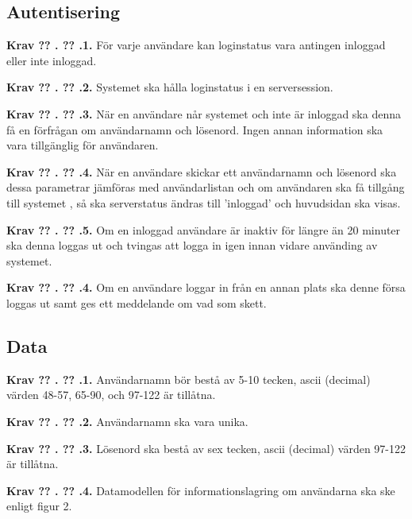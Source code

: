 \documentclass[a4paper]{article}
\newcommand\getcurrentref[1]{%
 \ifnumequal{\value{#1}}{0}
  {??}
  {\the\value{#1}}%
}
\newcommand\requirement[2]{
	\numberedrow{Krav}{#1}{#2}
}
\newcommand\numberedrow[3]{
	\noindent
	\textbf{#1 \getcurrentref{section}.\getcurrentref{subsection}.#2.} #3
	
}
\begin{document}
\subsection{Autentisering}
\requirement{1}{För varje användare kan loginstatus vara antingen inloggad eller inte inloggad.}
\requirement{2}{Systemet ska hålla loginstatus i en serversession.}
\requirement{3}{När en användare når systemet och inte är inloggad ska denna få en förfrågan om användarnamn och lösenord. Ingen annan information ska vara tillgänglig för användaren.}
\requirement{4}{När en användare skickar ett användarnamn och lösenord ska dessa parametrar jämföras med användarlistan och om användaren ska få tillgång till systemet , så ska serverstatus ändras till 'inloggad' och huvudsidan ska visas.}
\requirement{5}{Om en inloggad användare är inaktiv för längre än 20 minuter ska denna loggas ut och tvingas att logga in igen innan vidare använding av systemet.}
\requirement{4}{Om en användare loggar in från en annan plats ska denne försa loggas ut samt ges ett meddelande om vad som skett.}

\subsection{Data}
\label{krav-funk-data}
\requirement{1}{Användarnamn bör bestå av 5-10 tecken, ascii (decimal) värden 48-57, 65-90, och 97-122 är tillåtna.}
\requirement{2}{Användarnamn ska vara unika.}
\requirement{3}{Lösenord ska bestå av sex tecken, ascii (decimal) värden 97-122 är tillåtna.}

\requirement{4}{Datamodellen för informationslagring om användarna ska ske enligt figur 2.
}
\end{document}
